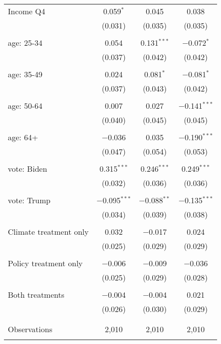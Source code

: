 \begin{tabular}{@{\extracolsep{5pt}}lccc}
 Income Q4 & 0.059$^{*}$ & 0.045 & 0.038 \\ 
  & (0.031) & (0.035) & (0.035) \\ 
  & & & \\ 
 age: 25-34 & 0.054 & 0.131$^{***}$ & $-$0.072$^{*}$ \\ 
  & (0.037) & (0.042) & (0.042) \\ 
  & & & \\ 
 age: 35-49 & 0.024 & 0.081$^{*}$ & $-$0.081$^{*}$ \\ 
  & (0.037) & (0.043) & (0.042) \\ 
  & & & \\ 
 age: 50-64 & 0.007 & 0.027 & $-$0.141$^{***}$ \\ 
  & (0.040) & (0.045) & (0.045) \\ 
  & & & \\ 
 age: 64+ & $-$0.036 & 0.035 & $-$0.190$^{***}$ \\ 
  & (0.047) & (0.054) & (0.053) \\ 
  & & & \\ 
 vote: Biden & 0.315$^{***}$ & 0.246$^{***}$ & 0.249$^{***}$ \\ 
  & (0.032) & (0.036) & (0.036) \\ 
  & & & \\ 
 vote: Trump & $-$0.095$^{***}$ & $-$0.088$^{**}$ & $-$0.135$^{***}$ \\ 
  & (0.034) & (0.039) & (0.038) \\ 
  & & & \\ 
 Climate treatment only & 0.032 & $-$0.017 & 0.024 \\ 
  & (0.025) & (0.029) & (0.029) \\ 
  & & & \\ 
 Policy treatment only & $-$0.006 & $-$0.009 & $-$0.036 \\ 
  & (0.025) & (0.029) & (0.028) \\ 
  & & & \\ 
 Both treatments & $-$0.004 & $-$0.004 & 0.021 \\ 
  & (0.026) & (0.030) & (0.029) \\ 
  & & & \\ 
\hline \\[-1.8ex] 

Observations & 2,010 & 2,010 & 2,010 \\ 
\hline 
\hline \\[-1.8ex] 
\end{tabular} 